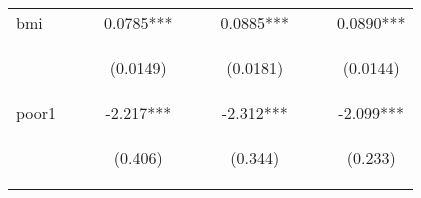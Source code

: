 \documentclass[]{article}
\begin{document}
\begin{center}
\begin{tabular}{lccccccccc}
bmi &  &  & 0.0785*** &  &  & 0.0885*** &  &  & 0.0890*** \\
\vspace{4pt} & \begin{footnotesize}\end{footnotesize} & \begin{footnotesize}\end{footnotesize} & \begin{footnotesize}(0.0149)\end{footnotesize} & \begin{footnotesize}\end{footnotesize} & \begin{footnotesize}\end{footnotesize} & \begin{footnotesize}(0.0181)\end{footnotesize} & \begin{footnotesize}\end{footnotesize} & \begin{footnotesize}\end{footnotesize} & \begin{footnotesize}(0.0144)\end{footnotesize} \\
poor1 &  &  & -2.217*** &  &  & -2.312*** &  &  & -2.099*** \\
\vspace{4pt} & \begin{footnotesize}\end{footnotesize} & \begin{footnotesize}\end{footnotesize} & \begin{footnotesize}(0.406)\end{footnotesize} & \begin{footnotesize}\end{footnotesize} & \begin{footnotesize}\end{footnotesize} & \begin{footnotesize}(0.344)\end{footnotesize} & \begin{footnotesize}\end{footnotesize} & \begin{footnotesize}\end{footnotesize} & \begin{footnotesize}(0.233)\end{footnotesize} \\

\end{tabular}
\end{center}
\end{document}
